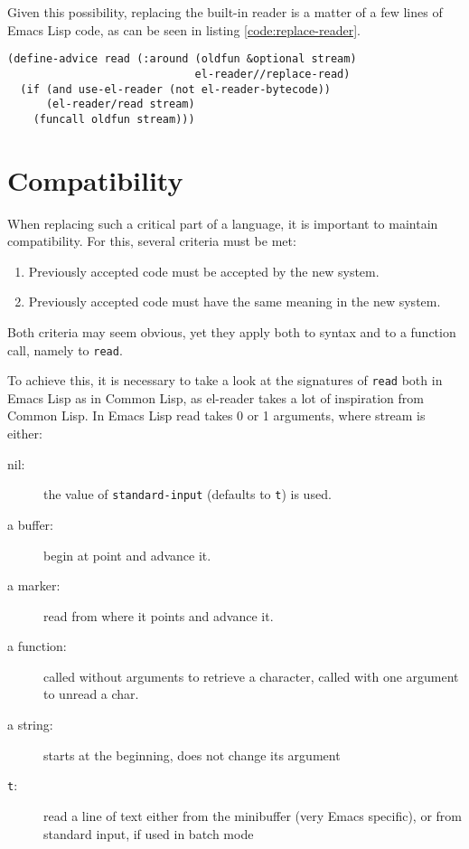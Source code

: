 \documentclass[a4paper,10pt,twoside]{report}
\newcommand{\el}{Emacs Lisp}
\newcommand{\cl}{Common Lisp}
\newcommand{\elr}{el-reader}
\newcommand{\sym}[1]{\texttt{#1}}
\newcommand{\fun}[1]{\texttt{#1}}
\newcommand{\Read}{\fun{read}}
\begin{document}
Given this possibility, replacing the built-in reader is a matter of a few lines
of \el{} code, as can be seen in listing \ref{code:replace-reader}.

\begin{lstlisting}[style=lispcode,caption={Replacing the built-in
    reader},label={code:replace-reader}]
(define-advice read (:around (oldfun &optional stream)
                             el-reader//replace-read)
  (if (and use-el-reader (not el-reader-bytecode))
      (el-reader/read stream)
    (funcall oldfun stream)))
\end{lstlisting}

\section{Compatibility}
\label{subsec:compat}

When replacing such a critical part of a language, it is important to maintain
compatibility.  For this, several criteria must be met:

\begin{enumerate}
\item Previously accepted code must be accepted by the new system.
\item Previously accepted code must have the same meaning in the new system.
\end{enumerate}

Both criteria may seem obvious, yet they apply both to syntax and to a function
call, namely to \Read{}.

To achieve this, it is necessary to take a look at the signatures of \Read{}
both in \el{} as in \cl{}, as \elr{} takes a lot of inspiration from \cl{}.  In
\el{} read takes 0 or 1 arguments, where stream is either:
\begin{description}
\item[nil:] the value of \sym{standard-input} (defaults to \sym{t}) is used.
\item[a buffer:] begin at point and advance it.
\item[a marker:] read from where it points and advance it.
\item[a function:] called without arguments to retrieve a character, called with
  one argument to unread a char.
\item[a string:] starts at the beginning, does not change its argument
\item[\sym{t}:] read a line of text either from the minibuffer (very Emacs
  specific), or from standard input, if used in batch mode
\end{description}
\end{document}
